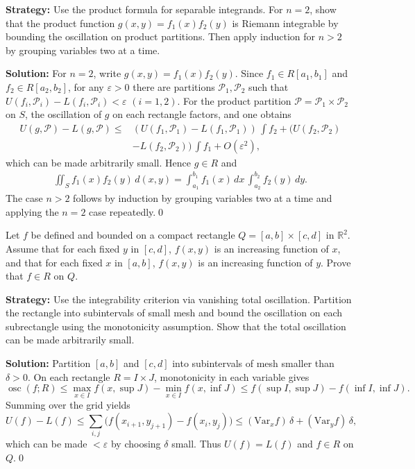 \noindent\textbf{Strategy:} Use the product formula for separable integrands. For $n=2$, show that the product function $g(x,y)=f_1(x)f_2(y)$ is Riemann integrable by bounding the oscillation on product partitions. Then apply induction for $n>2$ by grouping variables two at a time.

\bigskip\noindent\textbf{Solution:}
For $n=2$, write $g(x,y)=f_1(x)f_2(y)$. Since $f_1\in R[a_1,b_1]$ and $f_2\in R[a_2,b_2]$, for any $\varepsilon>0$ there are partitions $\mathcal P_1,\mathcal P_2$ such that $U(f_i,\mathcal P_i)-L(f_i,\mathcal P_i)<\varepsilon$ $(i=1,2)$. For the product partition $\mathcal P=\mathcal P_1\times\mathcal P_2$ on $S$, the oscillation of $g$ on each rectangle factors, and one obtains
\begin{align*}
 U(g,\mathcal P)-L(g,\mathcal P) \le & (U(f_1,\mathcal P_1)-L(f_1,\mathcal P_1))\,\int f_2 + (U(f_2,\mathcal P_2) \\
 &-L(f_2,\mathcal P_2))\,\int f_1 + O(\varepsilon^2), 
\end{align*}
which can be made arbitrarily small. Hence $g\in R$ and
\begin{align*}
 \iint_S f_1(x)f_2(y)\,d(x,y) = \int_{a_1}^{b_1} f_1(x)\,dx\,\int_{a_2}^{b_2} f_2(y)\,dy. 
\end{align*}
The case $n>2$ follows by induction by grouping variables two at a time and applying the $n=2$ case repeatedly.\qed


\begin{problembox}
\begin{problemstatement}
Let \( f \) be defined and bounded on a compact rectangle \( Q = [a, b] \times [c, d] \) in \( \mathbb{R}^2 \). Assume that for each fixed \( y \) in \([c, d]\), \( f(x, y) \) is an increasing function of \( x \), and that for each fixed \( x \) in \([a, b]\), \( f(x, y) \) is an increasing function of \( y \). Prove that \( f \in R \) on \( Q \).
\end{problemstatement}
\end{problembox}

\noindent\textbf{Strategy:} Use the integrability criterion via vanishing total oscillation. Partition the rectangle into subintervals of small mesh and bound the oscillation on each subrectangle using the monotonicity assumption. Show that the total oscillation can be made arbitrarily small.

\bigskip\noindent\textbf{Solution:}
Partition $[a,b]$ and $[c,d]$ into subintervals of mesh smaller than $\delta>0$. On each rectangle $R=I\times J$, monotonicity in each variable gives
\[ \operatorname{osc}(f;R) \le \max_{x\in I}\!f(x,\sup J)-\min_{x\in I}\!f(x,\inf J) \le f(\sup I,\sup J)-f(\inf I,\inf J). \]
Summing over the grid yields
\[ U(f)-L(f) \le \sum_{i,j} \big(f(x_{i+1},y_{j+1})-f(x_i,y_j)\big) \le (\text{Var}_x f)\,\delta + (\text{Var}_y f)\,\delta, \]
which can be made $<\varepsilon$ by choosing $\delta$ small. Thus $U(f)=L(f)$ and $f\in R$ on $Q$.\qed


